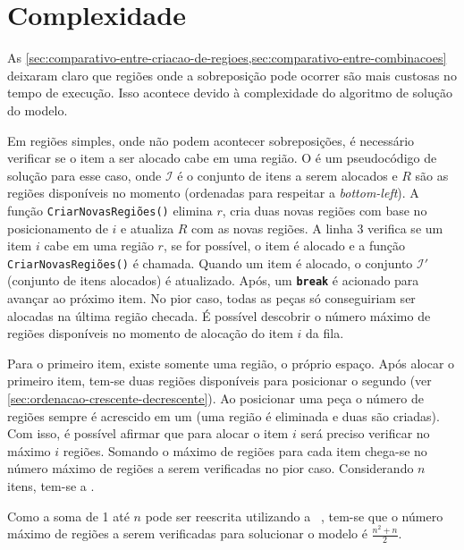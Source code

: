\section{Complexidade}\label{sec:complexidade}

As \cref{sec:comparativo-entre-criacao-de-regioes,sec:comparativo-entre-combinacoes} deixaram claro
que regiões onde a sobreposição pode ocorrer são mais custosas no tempo de execução.
Isso acontece devido à complexidade do algoritmo de solução do modelo.

Em regiões simples, onde não podem acontecer sobreposições, é necessário verificar se o item a ser
alocado cabe em uma região.
O  é um pseudocódigo de solução para esse caso, onde $\mathcal{I}$ é o
conjunto de itens a serem alocados e $R$ são as regiões disponíveis no momento (ordenadas para
respeitar a \textit{bottom-left}).
A função \texttt{CriarNovasRegiões()} elimina $r$, cria duas novas regiões com base no
posicionamento de $i$ e atualiza $R$ com as novas regiões.
A linha 3 verifica se um item $i$ cabe em uma região $r$, se for possível, o item é alocado e a
função \texttt{CriarNovasRegiões()} é chamada.
Quando um item é alocado, o conjunto $\mathcal{I'}$ (conjunto de itens alocados) é atualizado.
Após, um \texttt{\textbf{break}} é acionado para avançar ao próximo item.
No pior caso, todas as peças só conseguiriam ser alocadas na última região checada.
É possível descobrir o número máximo de regiões disponíveis no momento de alocação do item $i$ da
fila.



Para o primeiro item, existe somente uma região, o próprio espaço.
Após alocar o primeiro item, tem-se duas regiões disponíveis para posicionar o segundo (ver
\cref{sec:ordenacao-crescente-decrescente}).
Ao posicionar uma peça o número de regiões sempre é acrescido em um (uma região é eliminada e duas
são criadas).
Com isso, é possível afirmar que para alocar o item $i$ será preciso verificar no máximo $i$ regiões.
Somando o máximo de regiões para cada item chega-se no número máximo de regiões a serem verificadas
no pior caso.
Considerando $n$ itens, tem-se a .



Como a soma de 1 até $n$ pode ser reescrita utilizando a 
~\cite{merca2015alternative}, tem-se que o número máximo de regiões a serem verificadas
para solucionar o modelo é $\frac{n^2 + n}{2}$.

